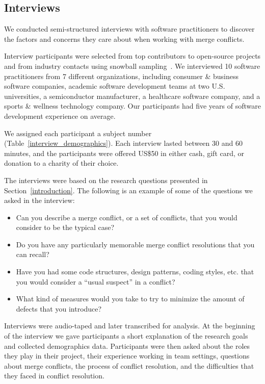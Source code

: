 \subsection{Interviews}\label{interview_methods}

We conducted semi-structured interviews with software practitioners to discover the factors and concerns they care about when working with merge conflicts.

Interview participants were selected from top contributors to open-source projects and from industry contacts using snowball sampling~\cite{goodman1961snowball}.
We interviewed 10 software practitioners from 7 different organizations, including consumer \& business software companies, academic software development teams at two U.S. universities, a semiconductor manufacturer, a healthcare software company, and a sports \& wellness technology company.
Our participants had five years of software development experience on average.

We assigned each participant a subject number (Table~\ref{interview_demographics}).
Each interview lasted between 30 and 60 minutes, and the participants were offered US\$50 in either cash, gift card, or donation to a charity of their choice.

The interviews were based on the research questions presented in Section~\ref{introduction}.
The following is an example of some of the questions we asked in the interview:
\begin{itemize}
	\item Can you describe a merge conflict, or a set of conflicts, that you would consider to be the typical case?
	\item Do you have any particularly memorable merge conflict resolutions that you can recall?
	\item Have you had some code structures, design patterns, coding styles, etc. that you would consider a ``usual suspect'' in a conflict?
	\item What kind of measures would you take to try to minimize the amount of defects that you introduce?
\end{itemize}

Interviews were audio-taped and later transcribed for analysis. 
At the beginning of the interview we gave participants a short explanation of the research goals and collected demographics data. 
Participants were then asked about the roles they play in their project, their experience working in team settings,  questions about merge conflicts, the process of conflict resolution, and the difficulties that they faced in conflict resolution. 


